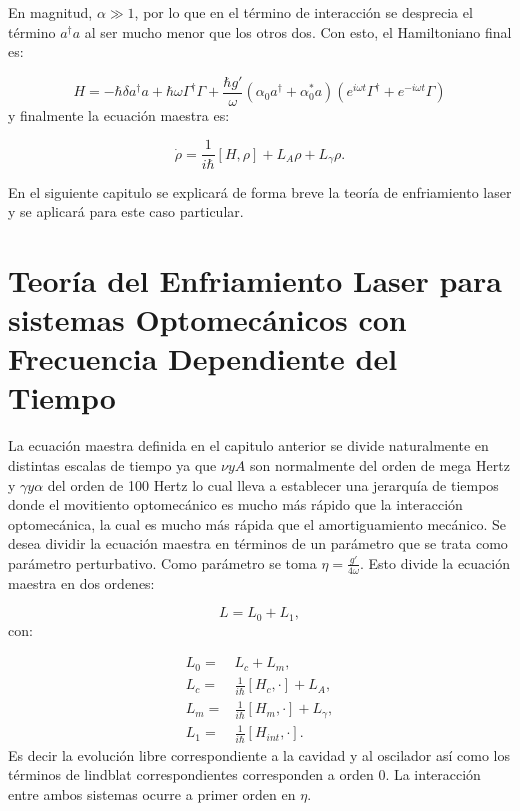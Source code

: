 \documentclass[a4paper,10pt]{report}
\begin{document}
En magnitud, $\alpha \gg 1$, por lo que en el término de interacción se desprecia el término $a^\dagger a$ al ser mucho menor que los otros dos. Con esto, el Hamiltoniano final es:

\begin{equation}
H = -\hbar \delta a^{\dagger}a +\hbar\omega\Gamma^{\dagger}\Gamma +\frac{\hbar g'}{\omega}(\alpha_0 a^{\dagger}+\alpha^*_0 a)(e^{i\omega t}\Gamma^{\dagger}+e^{-i\omega t}\Gamma)
\end{equation} y finalmente la ecuación maestra es:

\begin{equation}\label{LCMasterEq}
\dot{\rho} = \frac{1}{i\hbar}[H,\rho] +L_A\rho + L_\gamma \rho.
\end{equation}

En el siguiente capitulo se explicará de forma breve la teoría de enfriamiento laser y se aplicará para este caso particular.

\chapter{Teoría del Enfriamiento Laser para sistemas Optomecánicos con Frecuencia Dependiente del Tiempo}

La ecuación maestra definida en el capitulo anterior se divide naturalmente en distintas escalas de tiempo ya que $\nu y A$ son normalmente del orden de mega Hertz y $\gamma y \alpha$ del orden de 100 Hertz lo cual lleva a establecer una jerarquía de tiempos donde el movitiento optomecánico es mucho más rápido que la interacción optomecánica, la cual es mucho más rápida que el amortiguamiento mecánico. Se desea dividir la ecuación maestra en términos de un parámetro que se trata como parámetro perturbativo. Como parámetro se toma $\eta=\frac{g'}{4\omega}$. Esto divide la ecuación maestra en dos ordenes:

\begin{equation}
L = L_0 + L_1,
\end{equation} con:

\begin{align*}
L_0 =& L_c + L_m,\\
L_c =& \frac{1}{i\hbar}[H_c,\cdot] + L_A,\\
L_m =& \frac{1}{i\hbar}[H_m,\cdot] + L_\gamma,\\
L_1 =& \frac{1}{i\hbar}[H_{int},\cdot].
\end{align*} Es decir la evolución libre correspondiente a la cavidad y al oscilador así como los términos de lindblat correspondientes corresponden a orden 0. La interacción entre ambos sistemas ocurre a primer orden en $\eta$.
\end{document}
